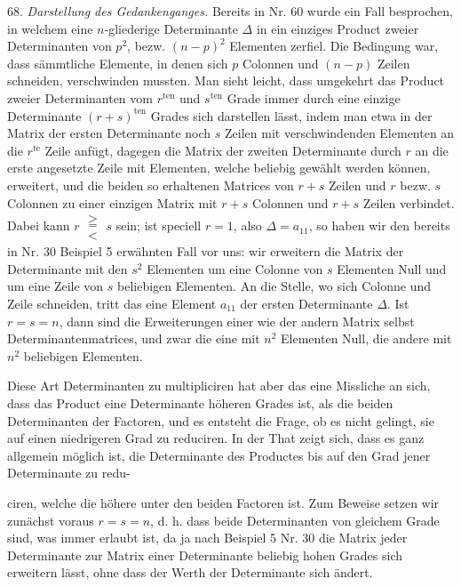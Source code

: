 68. \textit{Darstellung des Gedankenganges.} Bereits in Nr. 60 wurde ein
Fall besprochen, in welchem eine $n$-gliederige Determinante $\Delta$ in ein
einziges Product zweier Determinanten von $p^2$, bezw. $(n-p)^2$ Elementen
zerfiel. Die Bedingung war, dass sämmtliche Elemente, in denen sich $p$
Colonnen und $(n-p)$ Zeilen schneiden, verschwinden mussten. Man sieht
leicht, dass umgekehrt das Product zweier Determinanten vom $r^{\text{ten}}$
und $s^{\text{ten}}$ Grade immer durch eine einzige Determinante
$(r+s)^{\text{ten}}$ Grades sich darstellen lässt, indem man etwa in der
Matrix der ersten Determinante noch $s$ Zeilen mit verschwindenden
Elementen an die $r^{\text{te}}$ Zeile anfügt, dagegen die Matrix der
zweiten Determinante durch $r$ an die erste angesetzte Zeile mit
Elementen, welche beliebig gewählt werden können, erweitert, und die
beiden so erhaltenen Matrices von $r+s$ Zeilen und $r$ bezw. $s$ Colonnen
zu einer einzigen Matrix mit $r+s$ Colonnen und $r+s$ Zeilen verbindet.
Dabei kann $r\;\begin{smallmatrix}\geqq\\<\end{smallmatrix}\;s$ sein; %
ist speciell $r=1$, also $\Delta = a_{11}$, so haben wir den bereits in Nr. 30
Beispiel 5 erwähnten Fall vor uns: wir erweitern die Matrix der
Determinante mit den $s^2$ Elementen um eine Colonne von $s$ Elementen
Null und um eine Zeile von $s$ beliebigen Elementen. An die Stelle, wo
sich Colonne und Zeile schneiden, tritt das eine Element $a_{11}$ der
ersten Determinante $\Delta$. Ist $r=s=n$, dann sind die Erweiterungen
einer wie der andern Matrix selbst Determinantenmatrices, und zwar die
eine mit $n^2$ Elementen Null, die andere mit $n^2$ beliebigen Elementen.

Diese Art Determinanten zu multipliciren hat aber das eine Missliche an
sich, dass das Product eine Determinante höheren Grades ist, als die
beiden Determinanten der Factoren, und es entsteht die Frage, ob es
nicht gelingt, sie auf einen niedrigeren Grad zu reduciren. In der That
zeigt sich, dass es ganz allgemein möglich ist, die Determinante des
Productes bis auf den Grad jener Determinante zu redu-


ciren, welche die höhere unter den beiden Factoren ist. Zum Beweise
setzen wir zunächst voraus $r=s=n$, d. h. dass beide Determinanten von
gleichem Grade sind, was immer erlaubt ist, da ja nach Beispiel 5 Nr. 30
die Matrix jeder Determinante zur Matrix einer Determinante beliebig
hohen Grades sich erweitern lässt, ohne dass der Werth der Determinante
sich ändert.

